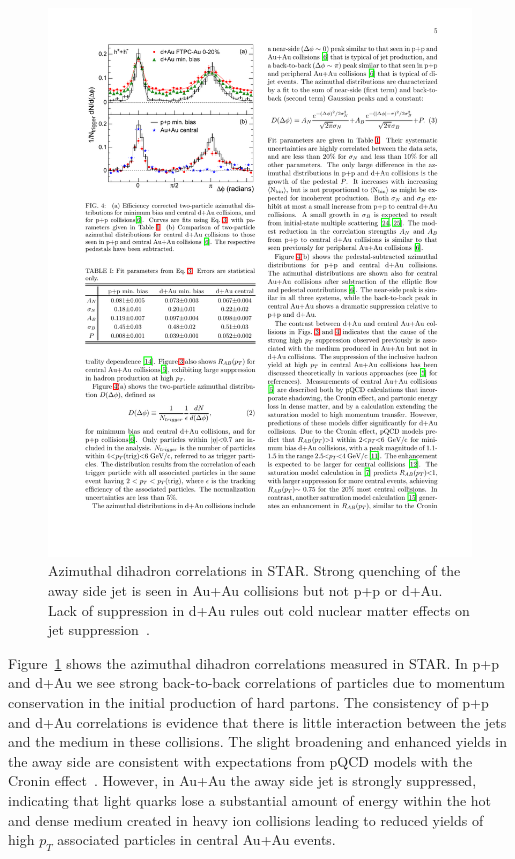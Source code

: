 \begin{figure}[htbp]
\begin{center}
\includegraphics[scale=1.2]{Plots/Intro/jet_quench.pdf}
\end{center}
\caption[Jet Quenching is STAR]{Azimuthal dihadron correlations in STAR. Strong quenching of the away side jet is seen in Au+Au collisions but not p+p or d+Au. Lack of suppression in d+Au rules out cold nuclear matter effects on jet suppression~\cite{STARdihad}.}
\label{fig:jet_quench}
\end{figure}

Figure~\ref{fig:jet_quench} shows the azimuthal dihadron correlations measured in STAR. In p+p and d+Au we see strong back-to-back correlations of particles due to momentum conservation in the initial production of hard partons. The consistency of p+p and d+Au correlations is evidence that there is little interaction between the jets and the medium in these collisions. The slight broadening and enhanced yields in the away side are consistent with expectations from pQCD models with the Cronin effect~\cite{cronin}. However, in Au+Au the away side jet is strongly suppressed, indicating that light quarks lose a substantial amount of energy within the hot and dense medium created in heavy ion collisions leading to reduced yields of high $p_T$ associated particles in central Au+Au events.


